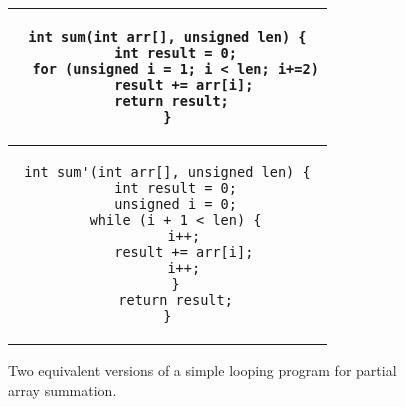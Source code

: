 \begin{figure}[H]
\centering
\begin{tabular} {c}
\begin{lstlisting}
int sum(int arr[], unsigned len) {
  int result = 0;
  for (unsigned i = 1; i < len; i+=2)
    result += arr[i];
 return result;
}
\end{lstlisting}
\\ \hline
\begin{lstlisting}
int sum'(int arr[], unsigned len) {
  int result = 0;
  unsigned i = 0;
  while (i + 1 < len) {
    i++;
    result += arr[i];
    i++;
  }
  return result;
}
\end{lstlisting}
\end{tabular}
\caption{Two equivalent versions of a simple looping program for partial array summation.}
\end{figure} 